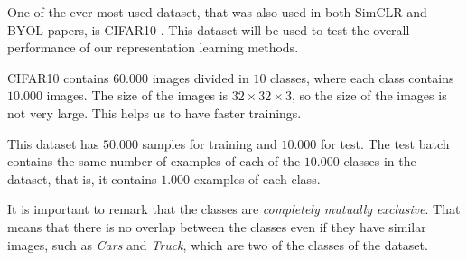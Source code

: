 One of the ever most used dataset, that was also used in both SimCLR and BYOL papers, is CIFAR10 \citep{krizhevsky_learning_nodate}. This dataset will be used to test the overall performance of our representation learning methods.

CIFAR10 contains $60.000$ images divided in $10$ classes, where each class contains $10.000$ images. The size of the images is $32\times 32\times 3$, so the size of the images is not very large. This helps us to have faster trainings.

This dataset has $50.000$ samples for training and $10.000$ for test. The test batch contains the same number of examples of each of the $10.000$ classes in the dataset, that is, it contains $1.000$ examples of each class. 

It is important to remark that the classes are \emph{completely mutually exclusive}. That means that there is no overlap between the classes even if they have similar images, such as \emph{Cars} and \emph{Truck}, which are two of the classes of the dataset.